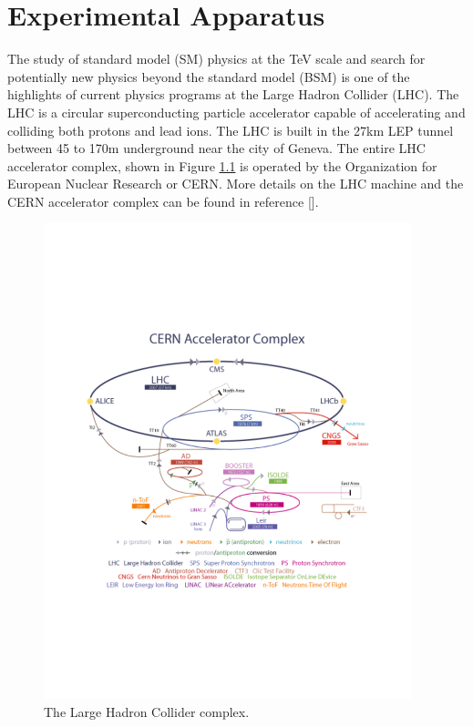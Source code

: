 \chapter{Experimental Apparatus}
\label{chap:Exp}

\indent The study of standard model (SM) physics at the TeV scale and search for potentially new physics beyond the standard model (BSM) is one of the highlights of current physics programs at the Large Hadron Collider (LHC).  The LHC is a circular superconducting particle accelerator capable of accelerating and colliding both protons and lead ions.  The LHC is built in the 27km LEP tunnel between 45 to 170m underground near the city of Geneva.  The entire LHC accelerator complex, shown in Figure \ref{LHC:fig:LHCComplex} is operated by the Organization for European Nuclear Research or CERN. More details on the LHC machine and the CERN accelerator complex can be found in reference [\cite{LHC}]. \\

\begin{figure}[h!]
\centering
\includegraphics[width=0.95\textwidth, angle=0]{figures/LHC_ATLAS/AccComplex0700829.pdf}
\caption{ The Large Hadron Collider complex.\cite{LHC} \label{LHC:fig:LHCComplex}}
\end{figure}

